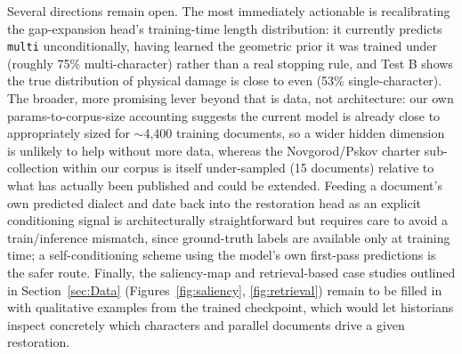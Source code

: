 \documentclass{article}
\begin{document}
Several directions remain open. The most immediately actionable is recalibrating the gap-expansion head's training-time length distribution: it currently predicts \texttt{multi} unconditionally, having learned the geometric prior it was trained under (roughly 75\% multi-character) rather than a real stopping rule, and Test B shows the true distribution of physical damage is close to even (53\% single-character). The broader, more promising lever beyond that is data, not architecture: our own params-to-corpus-size accounting suggests the current model is already close to appropriately sized for $\sim$4,400 training documents, so a wider hidden dimension is unlikely to help without more data, whereas the Novgorod/Pskov charter sub-collection within our corpus is itself under-sampled (15 documents) relative to what has actually been published and could be extended. Feeding a document's own predicted dialect and date back into the restoration head as an explicit conditioning signal is architecturally straightforward but requires care to avoid a train/inference mismatch, since ground-truth labels are available only at training time; a self-conditioning scheme using the model's own first-pass predictions is the safer route. Finally, the saliency-map and retrieval-based case studies outlined in Section~\ref{sec:Data} (Figures~\ref{fig:saliency}, \ref{fig:retrieval}) remain to be filled in with qualitative examples from the trained checkpoint, which would let historians inspect concretely which characters and parallel documents drive a given restoration.

\printbibliography[title={References}]
\end{document}
